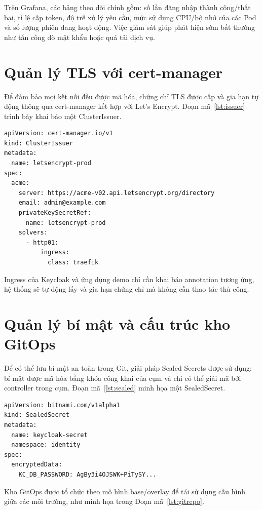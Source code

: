 Trên Grafana, các bảng theo dõi chính gồm: số lần đăng nhập thành công/thất bại,
tỉ lệ cấp token, độ trễ xử lý yêu cầu, mức sử dụng CPU/bộ nhớ của các Pod và số
lượng phiên đang hoạt động. Việc giám sát giúp phát hiện sớm bất thường như tấn
công dò mật khẩu hoặc quá tải dịch vụ.

\section{Quản lý TLS với cert-manager}
\label{sec:tls}

Để đảm bảo mọi kết nối đều được mã hóa, chứng chỉ TLS được cấp và gia hạn tự
động thông qua cert-manager kết hợp với Let's Encrypt. Đoạn mã~\ref{lst:issuer}
trình bày khai báo một ClusterIssuer.

\begin{lstlisting}[caption={Khai bao ClusterIssuer cho Let's Encrypt},label={lst:issuer}]
apiVersion: cert-manager.io/v1
kind: ClusterIssuer
metadata:
  name: letsencrypt-prod
spec:
  acme:
    server: https://acme-v02.api.letsencrypt.org/directory
    email: admin@example.com
    privateKeySecretRef:
      name: letsencrypt-prod
    solvers:
      - http01:
          ingress:
            class: traefik
\end{lstlisting}

Ingress của Keycloak và ứng dụng demo chỉ cần khai báo annotation tương ứng, hệ
thống sẽ tự động lấy và gia hạn chứng chỉ mà không cần thao tác thủ công.

\section{Quản lý bí mật và cấu trúc kho GitOps}
\label{sec:gitops-secret}

Để có thể lưu bí mật an toàn trong Git, giải pháp Sealed Secrets được sử dụng:
bí mật được mã hóa bằng khóa công khai của cụm và chỉ có thể giải mã bởi
controller trong cụm. Đoạn mã~\ref{lst:sealed} minh họa một SealedSecret.

\begin{lstlisting}[caption={Vi du mot SealedSecret},label={lst:sealed}]
apiVersion: bitnami.com/v1alpha1
kind: SealedSecret
metadata:
  name: keycloak-secret
  namespace: identity
spec:
  encryptedData:
    KC_DB_PASSWORD: AgBy3i4OJSWK+PiTySY...
\end{lstlisting}

Kho GitOps được tổ chức theo mô hình base/overlay để tái sử dụng cấu hình giữa
các môi trường, như minh họa trong Đoạn mã~\ref{lst:gitrepo}.

